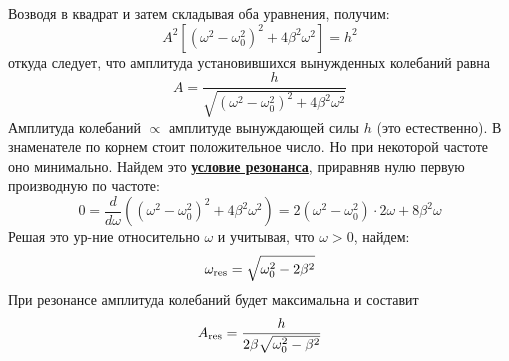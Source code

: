 \documentclass[12pt,epsfig,color,russian]{article}
\begin{document}
Возводя в квадрат и затем складывая оба уравнения, получим:
\begin{displaymath}
A^2\left[\left(\omega^2\!\!-\omega_0^2\right)^2+4\beta^2\omega^2\right]=h^2
\end{displaymath}
откуда следует, что амплитуда установившихся вынужденных колебаний равна\vspace{-6mm}
\begin{displaymath}
A=\frac{h}{\sqrt{\left(\omega^2\!\!-\omega_0^2\right)^2+4\beta^2\omega^2}}
\end{displaymath}
Амплитуда колебаний $\propto$ амплитуде вынуждающей силы $h$ (это естественно). В знаменателе по корнем стоит положительное число. Но при некоторой частоте оно минимально. Найдем это \underline{\bf условие резонанса}, приравняв нулю первую производную по частоте:
\begin{displaymath}
0=\frac{d}{d\omega}\left(\left(\omega^2\!\!-\omega_0^2\right)^2+4\beta^2\omega^2\right)=
2\left(\omega^2\!\!-\omega_0^2\right)\cdot2\omega+8\beta^2\omega
\end{displaymath}
Решая это ур-ние относительно $\omega$ и учитывая, что $\omega>0$, найдем:
\begin{displaymath}
\omega_{\rm res}=\sqrt{\omega_0^2-2\beta^2}
\end{displaymath}
При резонансе амплитуда колебаний будет максимальна и составит
\begin{displaymath}
A_{\rm res}=\frac{h}{2\beta\sqrt{\omega_0^2-\beta^2}}
\end{displaymath}
\end{document}
